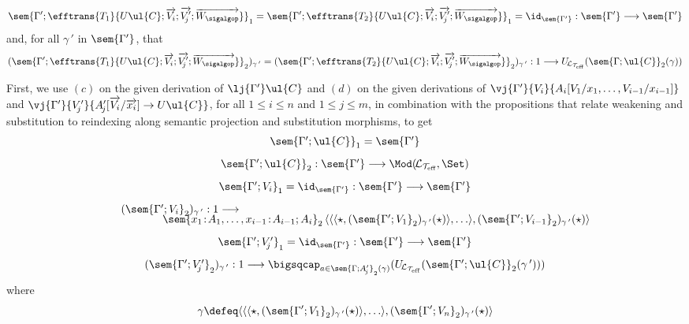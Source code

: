 \[
\sem{\Gamma';\efftrans {T_1} {U\ul{C}; \overrightarrow{V_i}; \overrightarrow{V'_{\!j}}; \overrightarrow{W_{\sigalgop}}}}_1 = \sem{\Gamma'; \efftrans {T_2} {U\ul{C}; \overrightarrow{V_i}; \overrightarrow{V'_{\!j}}; \overrightarrow{W_{\sigalgop}}}}_1 = \id_{\sem{\Gamma'}} : \sem{\Gamma'} \longrightarrow \sem{\Gamma'}
\]
and, for all $\gamma\,'$ in $\sem{\Gamma'}$, that 
\[
(\sem{\Gamma';\efftrans {T_1} {U\ul{C}; \overrightarrow{V_i}; \overrightarrow{V'_{\!j}}; \overrightarrow{W_{\sigalgop}}}}_2)_{\gamma\,'} = (\sem{\Gamma'; \efftrans {T_2} {U\ul{C}; \overrightarrow{V_i}; \overrightarrow{V'_{\!j}}; \overrightarrow{W_{\sigalgop}}}}_2)_{\gamma\,'} : 1 \longrightarrow U_{\!\mathcal{L}_{\mathcal{T}_{\text{eff}}}}(\sem{\Gamma;\ul{C}}_2(\gamma))
\]

First, we use $(c)$ on the given derivation of $\lj {\Gamma'} \ul{C}$ and $(d)$ on the given derivations of  $\vj {\Gamma'} {V_i} {A_i[V_1/x_1, \ldots, V_{i-1}/x_{i-1}]}$ and $\vj {\Gamma'} {V'_{\!j}} {A'_{\!j}[\overrightarrow{V_i}/\overrightarrow{x_i}] \to U\ul{C}}$, for all $1 \leq i \leq n$ and $1 \leq j \leq m$, in combination with the propositions that relate weakening and substitution to reindexing along semantic projection and substitution morphisms, to get 
\[
\begin{array}{c}
\sem{\Gamma';\ul{C}}_1 = \sem{\Gamma'}
\\[3mm]
\sem{\Gamma';\ul{C}}_2 : \sem{\Gamma'} \longrightarrow \Mod(\!\mathcal{L}_{\mathcal{T}_{\text{eff}}},\Set)
\\[3mm]
\sem{\Gamma';V_i}_1 = \id_{\sem{\Gamma'}}  : \sem{\Gamma'} \longrightarrow \sem{\Gamma'}
\\[3mm]
\hspace{-10.5cm}
(\sem{\Gamma';V_i}_2)_{\gamma\,'} : 1 \longrightarrow 
\\[-1mm]
\hspace{2cm}
\sem{x_1 \!:\! A_1, \ldots, x_{i-1} \!:\! A_{i - 1};A_i}_2\, \langle \langle \langle \star , (\sem{\Gamma'; V_1}_2)_{\gamma\,'}(\star) \rangle , \ldots \rangle , (\sem{\Gamma'; V_{i - 1}}_2)_{\gamma\,'}(\star) \rangle
\\[3mm]
\sem{\Gamma';V'_{\!j}}_1 = \id_{\sem{\Gamma'}}  : \sem{\Gamma'} \longrightarrow \sem{\Gamma'}
\\[3mm]
(\sem{\Gamma';V'_{\!j}}_2)_{\gamma\,'} : 1 \longrightarrow \bigsqcap_{a \in \sem{\Gamma;A'_{\!j}}_2(\gamma)}(U_{\!\mathcal{L}_{\mathcal{T}_{\text{eff}}}}(\sem{\Gamma';\ul{C}}_2(\gamma\,')))
\end{array}
\]
where
\[
\gamma \defeq \langle \langle \langle \star , (\sem{\Gamma'; V_1}_2)_{\gamma\,'}(\star) \rangle , \ldots \rangle , (\sem{\Gamma'; V_n}_2)_{\gamma\,'}(\star) \rangle
\]
